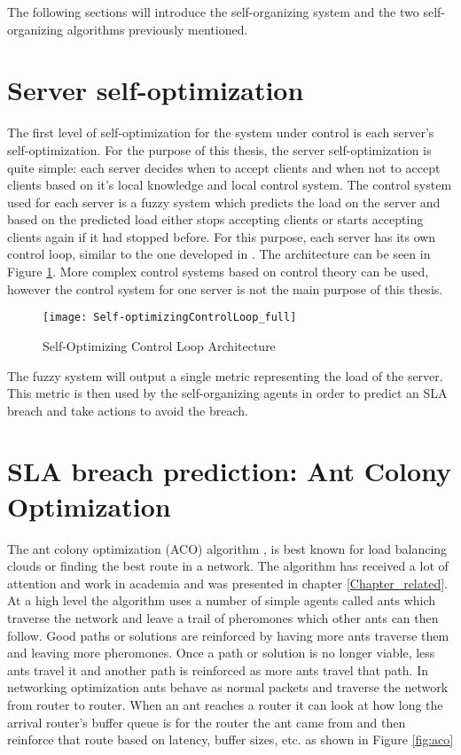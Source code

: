 The following sections will introduce the self-organizing system and the two self-organizing algorithms previously mentioned.

\section{Server self-optimization}

The first level of self-optimization for the system under control is each server's self-optimization. For the purpose of this thesis, the server self-optimization is quite simple: each server decides when to accept clients and when not to accept clients based on it's local knowledge and local control system. The control system used for each server is a fuzzy system which predicts the load on the server and based on the predicted load either stops accepting clients or starts accepting clients again if it had stopped before. For this purpose, each server has its own control loop, similar to the one developed in \cite{bogdan:seams07}. The architecture can be seen in Figure \ref{fig:selfopt-archi}. More complex control systems based on control theory can be used, however the control system for one server is not the main purpose of this thesis.

\begin{figure}
	\centering
	\texttt{[image: Self-optimizingControlLoop\_full]}
	\caption{Self-Optimizing Control Loop Architecture}
	\label{fig:selfopt-archi}
\end{figure}

The fuzzy system will output a single metric representing the load of the server. This metric is then used by the self-organizing agents in order to predict an SLA breach and take actions to avoid the breach.

\section{SLA breach prediction: Ant Colony Optimization}

The ant colony optimization (ACO) algorithm \cite{antalgorithm}, \cite{selforg:aco} is best known for load balancing clouds or finding the best route in a network. The algorithm has received a lot of attention and work in academia and was presented in chapter \ref{Chapter_related}. At a high level the algorithm uses a number of simple agents called ants which traverse the network and leave a trail of pheromones which other ants can then follow. Good paths or solutions are reinforced by having more ants traverse them and leaving more pheromones. Once a path or solution is no longer viable, less ants travel it and another path is reinforced as more ants travel that path. In networking optimization ants behave as normal packets and traverse the network from router to router. When an ant reaches a router it can look at how long the arrival router's buffer queue is for the router the ant came from and then reinforce that route based on latency, buffer sizes, etc. as shown in Figure \ref{fig:aco}

